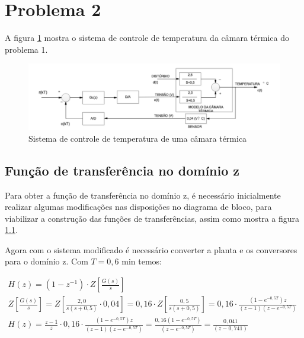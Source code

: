 \documentclass[a4paper,12pt]{article}
\begin{document}
	\section{Problema 2}
		A figura \ref{fig:plantaproblema2} mostra o sistema de controle de temperatura da câmara térmica do problema 1.
		
		\begin{figure}[H]
			\centering
			\includegraphics[width=0.9\linewidth]{images/planta_problema2.png}
			\caption{Sistema de controle de temperatura de uma câmara térmica}
			\label{fig:plantaproblema2}
		\end{figure}
	
		\subsection{Função de transferência no domínio z}	
			Para obter a função de transferência no domínio z, é necessário inicialmente realizar algumas modificações nas disposições no diagrama de bloco, para viabilizar a construção das funções de transferências, assim como mostra a figura \ref{}.
			
			
			Agora com o sistema modificado é necessário converter a planta e os conversores para o domínio z. Com $T=0,6$ min temos:
					
		
			\begin{equation}
				\left.
				\begin{array}{c}
					\displaystyle H(z) = (1 - z^{-1}) \cdot Z\left[\frac{G(s)}{s}\right] \\[20pt]
					
					\displaystyle Z\left[\frac{G(s)}{s}\right] = Z\left[\frac{2,0}{s(s+0,5)}  \cdot 0,04 \right] = 0,16 \cdot Z\left[\frac{0,5}{s(s+0,5)}\right] = 0,16 \cdot \frac{(1 - e^{-0,5T})z}{(z-1)(z-e^{-0,5T})} \\[20pt]
					\displaystyle H(z) = \frac{z-1}{z} \cdot 0,16 \cdot \frac{(1 - e^{-0,5T})z}{(z-1)(z-e^{-0,5T})} = \frac{0,16(1 - e^{-0,5T})}{(z-e^{-0,5T})} = \frac{0,041}{(z-0,741)}
				\end{array}
				\right.
				\quad 
				\label{eq:hz06}
			\end{equation}
			
\end{document}

